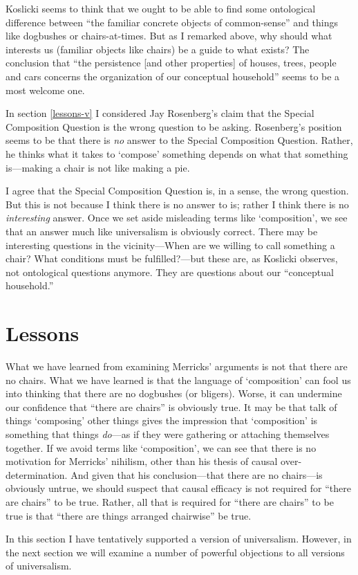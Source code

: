 \documentclass[11pt]{article}
\begin{document}
\begin{spacing}{1.25}
Koslicki seems to think that we ought to be able to find some
ontological difference between ``the familiar concrete objects of
common-sense'' and things like dogbushes or chairs-at-times.  But as I
remarked above, why should what interests us (familiar objects like
chairs) be a guide to what exists?  The conclusion that ``the
persistence [and other properties] of houses, trees, people and cars
concerns the organization of our conceptual household'' seems to be a
most welcome one.

In section \ref{lessons-v} I considered Jay Rosenberg's claim that
the Special Composition Question is the wrong question to be asking.
Rosenberg's position seems to be that there is {\em no} answer to the
Special Composition Question.  Rather, he thinks what it takes to
`compose' something depends on what that something is---making a chair
is not like making a pie.

I agree that the Special Composition Question is, in a sense, the
wrong question.  But this is not because I think there is no answer to
is; rather I think there is no {\em interesting} answer.  Once we set
aside misleading terms like `composition', we see that an answer much
like universalism is obviously correct.  There may be interesting
questions in the vicinity---When are we willing to call something a
chair?  What conditions must be fulfilled?---but these are, as
Koslicki observes, not ontological questions anymore.  They are
questions about our ``conceptual household.''

\section{Lessons}
What we have learned from examining Merricks' arguments is not that
there are no chairs.  What we have learned is that the language of
`composition' can fool us into thinking that there are no dogbushes
(or bligers).  Worse, it can undermine our confidence that ``there are
chairs'' is obviously true.  It may be that talk of things `composing'
other things gives the impression that `composition' is something that
things {\em do}---as if they were gathering or attaching themselves
together.  If we avoid terms like `composition', we can see that there
is no motivation for Merricks' nihilism, other than his thesis of
causal over-determination.  And given that his conclusion---that there
are no chairs---is obviously untrue, we should suspect that causal
efficacy is not required for ``there are chairs'' to be true.  Rather,
all that is required for ``there are chairs'' to be true is that
``there are things arranged chairwise'' be true.

In this section I have tentatively supported a version of
universalism.  However, in the next section we will examine a number
of powerful objections to all versions of universalism.

\ifstandalone
\end{spacing}


\fi
\end{document}
